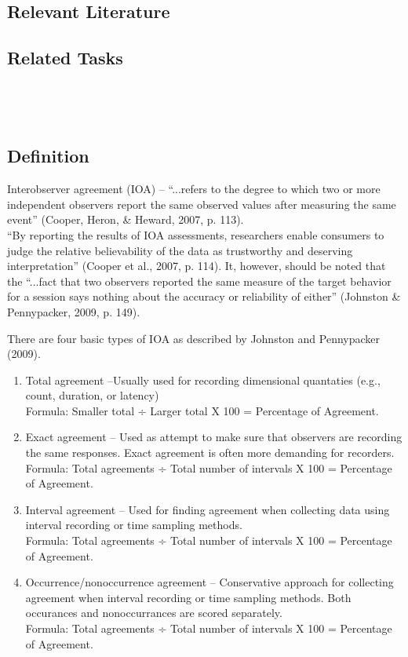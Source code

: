 \subsection{Relevant Literature}
\begin{refsection}
\nocite{cooper2007applied,lahey1974facilitation}
\printbibliography[heading=none]
\end{refsection}
%
\subsection{Related Tasks}
\fourhOne{}\\
\fourhThree{}\\
%
%
%
%
%
\section{\fouraEight{}}
\subsection{Definition} 
Interobserver agreement (IOA) –  ``...refers to the degree to which two or more independent observers report the same observed values after measuring the same event'' (Cooper, Heron, \& Heward, 2007, p. 113).\\

``By reporting the results of IOA assessments, researchers enable consumers to judge the relative believability of the data as trustworthy and deserving interpretation'' (Cooper et al., 2007, p. 114). It, however, should be noted that the ``...fact that two observers reported the same measure of the target behavior for a session says nothing about the accuracy or reliability of either'' (Johnston \& Pennypacker, 2009, p. 149).

There are four basic types of IOA as described by Johnston and Pennypacker (2009).
\begin{enumerate}
\item Total agreement –Usually used for recording dimensional quantaties (e.g., count, duration, or latency)\\  Formula: Smaller total ÷ Larger total X 100 = Percentage of Agreement.
\item Exact agreement – Used as attempt to make sure that observers are recording the same responses. Exact agreement is often more demanding for recorders.\\
Formula: Total agreements ÷ Total number of intervals X 100 = Percentage of Agreement.
\item Interval agreement – Used for finding agreement when collecting data using interval recording or time sampling methods.\\
Formula: Total agreements ÷ Total number of intervals X 100 = Percentage of Agreement.
\item Occurrence/nonoccurrence agreement – Conservative approach for collecting agreement when interval recording or time sampling methods. Both occurances and nonoccurrances are scored separately.\\
Formula: Total agreements ÷ Total number of intervals X 100 = Percentage of Agreement.
\end{enumerate}
%
